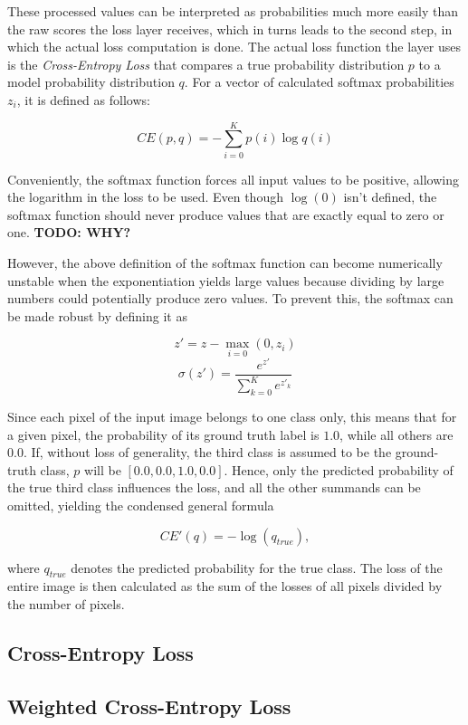 These processed values can be interpreted as probabilities much more easily than the raw scores the loss layer receives, which in turns leads to the second step, in which the actual loss computation is done. The actual loss function the layer uses is the \textit{Cross-Entropy Loss} that compares a true probability distribution $p$ to a model probability distribution $q$. For a vector of calculated softmax probabilities $z_i$, it is defined as follows:

\[CE(p, q) = -\sum \limits_{i = 0}^{K} p(i) \log q(i)\]

\noindent Conveniently, the softmax function forces all input values to be positive, allowing the logarithm in the loss to be used. Even though $\log (0)$ isn't defined, the softmax function should never produce values that are exactly equal to zero or one. \textbf{TODO: WHY?} 

However, the above definition of the softmax function can become numerically unstable when the exponentiation yields large values because dividing by large numbers could potentially produce zero values. To prevent this, the softmax can be made robust by defining it as

\[z' = z - \max \limits_{i = 0}(0, z_i)\]
\[\sigma(z') = \frac{e^{z'}}{\sum_{k=0}^{K} e^{z'_{{k}}}}\]

\noindent Since each pixel of the input image belongs to one class only, this means that for a given pixel, the probability of its ground truth label is $1.0$, while all others are $0.0$. If, without loss of generality, the third class is assumed to be the ground-truth class, $p$ will be $[0.0, 0.0, 1.0, 0.0]$.  Hence, only the predicted probability of the true third class influences the loss, and all the other summands can be omitted, yielding the condensed general formula

\[CE'(q) = - \log(q_{true}),\]

\noindent where $q_{true}$ denotes the predicted probability for the true class. The loss of the entire image is then calculated as the sum of the losses of all pixels divided by the number of pixels.

		\subsection{Cross-Entropy Loss}
\label{subsec:cross_ent}

		\subsection{Weighted Cross-Entropy Loss}

